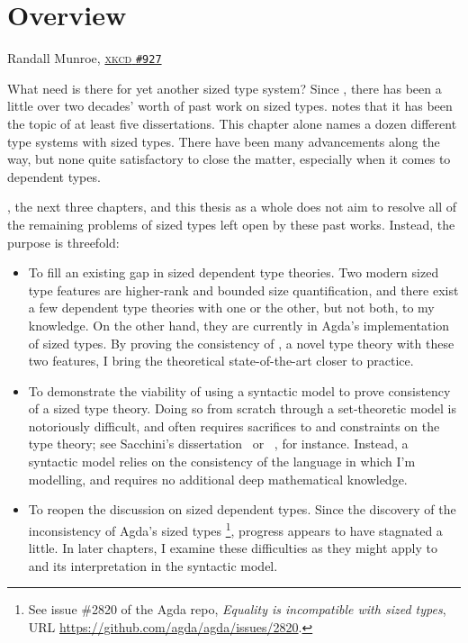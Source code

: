 \chapter{Overview} \label{sec:overview}

{Randall Munroe, \href{https://xkcd.com/927/}{\textsc{xkcd} \texttt{\#927}}}

What need is there for yet another sized type system?
Since \citet{hughes}, there has been a little over two decades' worth of past work on sized types.
\citet{flationary} notes that it has been the topic of at least five dissertations.
This chapter alone names a dozen different type systems with sized types.
There have been many advancements along the way,
but none quite satisfactory to close the matter,
especially when it comes to dependent types.

\lang, the next three chapters, and this thesis as a whole does not aim to resolve
all of the remaining problems of sized types left open by these past works.
Instead, the purpose is threefold:

\begin{itemize}
  \item To fill an existing gap in sized dependent type theories.
    Two modern sized type features are higher-rank and bounded size quantification,
    and there exist a few dependent type theories with one or the other,
    but not both, to my knowledge.
    On the other hand, they are currently in Agda's implementation of sized types.
    By proving the consistency of \lang, a novel type theory with these two features,
    I bring the theoretical state-of-the-art closer to practice.
  \item To demonstrate the viability of using a syntactic model to prove consistency
    of a sized type theory.
    Doing so from scratch through a set-theoretic model is notoriously difficult,
    and often requires sacrifices to and constraints on the type theory;
    see Sacchini's dissertation~\citep{CIC-hat-minus} or \CIChatstar~\citep{CIC-hat-star},
    for instance.
    Instead, a syntactic model relies on the consistency of the language in which I'm modelling,
    and requires no additional deep mathematical knowledge.
  \clearpage %
  \item To reopen the discussion on sized dependent types.
    Since the discovery of the inconsistency of Agda's sized types%
    \footnote{\label{foot:agda-inconsistent} See issue \#2820 of the Agda repo,
    \textit{Equality is incompatible with sized types},
    URL \url{https://github.com/agda/agda/issues/2820}.},
    progress appears to have stagnated a little.
    In later chapters, I examine these difficulties as they might apply to \lang
    and its interpretation in the syntactic model.
\end{itemize}


